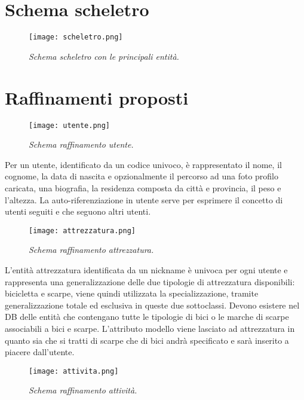 \documentclass[12pt]{report}
\begin{document}
\section{Schema scheletro}

\begin{figure}[H]
    \texttt{[image: scheletro.png]}
    \centering
    \caption{\emph{Schema scheletro con le principali entità.}}
    \label{img:schema_scheletro}
\end{figure}

\section{Raffinamenti proposti}

\begin{figure}[H]
    \texttt{[image: utente.png]}
    \centering
    \caption{\emph{Schema raffinamento utente.}}
    \label{img:schema_utente}
\end{figure}

Per un utente, identificato da un codice univoco, è rappresentato il nome, il cognome,
la data di nascita e opzionalmente il percorso ad una foto profilo caricata, una biografia,
la residenza composta da città e provincia, il peso e l'altezza.
La auto-riferenziazione in utente serve per esprimere il concetto di utenti seguiti e che seguono altri utenti.

\begin{figure}[H]
    \texttt{[image: attrezzatura.png]}
    \centering
    \caption{\emph{Schema raffinamento attrezzatura.}}
    \label{img:schema_attrezzatura}
\end{figure}

L'entità attrezzatura identificata da un nickname è univoca per ogni utente e rappresenta una generalizzazione delle due tipologie 
di attrezzatura disponibili: bicicletta e scarpe, viene quindi utilizzata la specializzazione, tramite generalizzazione totale ed
esclusiva in queste due sottoclassi. Devono esistere nel DB delle entità che contengano tutte le tipologie di bici o le marche di
scarpe associabili a bici e scarpe. L'attributo modello viene lasciato ad attrezzatura in quanto sia che si tratti di scarpe che
di bici andrà specificato e sarà inserito a piacere dall'utente.

\begin{figure}[H]
    \texttt{[image: attivita.png]}
    \centering
    \caption{\emph{Schema raffinamento attività.}}
    \label{img:schema_attivita}
\end{figure}
\end{document}

